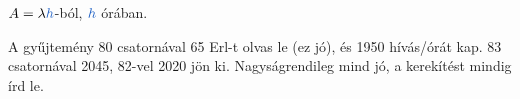 \begin{center}\end{center}

$A=\lambda {\ca{h}}$-ból, ${\ca{h}}$ órában.

\begin{center}\end{center}
\begin{figyelem}[Javítás]
A gyűjtemény 80 csatornával 65 Erl-t olvas le (ez jó), és 1950 hívás/órát kap. 83 csatornával 2045, 82-vel 2020 jön ki. Nagyságrendileg mind jó, a kerekítést mindig írd le.
\end{figyelem}
\begin{eredmeny}

\begin{center}\end{center}
\end{eredmeny}


